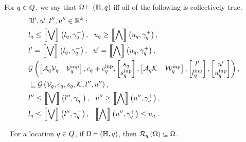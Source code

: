 \begin{definition}
  For $q\in Q$, we say that
  $\Omega\vdash\left(\mathbb{H},q\right)$ iff  all of the following is
  collectively true.
%
\begin{align}
& \exists l^\prime,u^\prime,l^{\prime\prime},u^{\prime\prime}\in\mathbb{R}^k:\nonumber\\
& l_q\leq\left\llbracket\bigvee\right\rrbracket\left(l_q,\gamma_q^-\right),~~u_q\geq\left\llbracket\bigwedge\right\rrbracket\left(u_q,\gamma_q^+\right),~\label{eqn:continv1}\\
& l^\prime= \left\llbracket\bigvee\right\rrbracket\left(l_q,\gamma_q^-\right),~~u^\prime= \left\llbracket\bigwedge\right\rrbracket\left(u_q,\gamma_q^+\right),~\label{eqn:continv2}\\
& \mathcal{G}\left(
\left[\begin{matrix}\mathcal{A}_q\mathcal{V}_q & \mathcal{V}^{\operatorname{inp}}_q\end{matrix}\right]
,
c_q+c^{\operatorname{inp}}_q
,
\left[\begin{matrix}s_q\\ s^{\operatorname{inp}}_q\end{matrix}\right]
,
\left[\begin{matrix}\mathcal{A}_q\mathcal{K} & \mathcal{W}^{\operatorname{inp}}_q\end{matrix}\right]
,
\left[\begin{matrix}l^\prime\\l^{\operatorname{inp}}_q\end{matrix}\right]
,
\left[\begin{matrix}u^\prime\\ u^{\operatorname{inp}}_q\end{matrix}\right]
\right),\nonumber\\
& \sqsubseteq 
\mathcal{G}\left(\mathcal{V}_q,c_q,s_q,\mathcal{K},l^{\prime\prime},u^{\prime\prime}\right),~\label{eqn:continv3}\\
&
l^{\prime\prime}\leq\left\llbracket\bigvee\right\rrbracket\left(l^{\prime\prime},\gamma_q^-\right),~~u^{\prime\prime}\geq\left\llbracket\bigwedge\right\rrbracket\left(u^{\prime\prime},\gamma_q^+\right),~\label{eqn:continv4}\\
& l_q\leq\left\llbracket\bigvee\right\rrbracket\left(l^{\prime\prime},\gamma_q^-\right),~~\left\llbracket\bigwedge\right\rrbracket\left(u^{\prime\prime},\gamma_q^+\right)\leq u_q~\label{eqn:continv5}.
\end{align}
%
\end{definition}
%
\begin{lemma}~\label{lem:pi-cont}
For a location $q\in Q$, if $\Omega\vdash\left(\mathbb{H},q\right)$, then
$\mathcal{R}_{q}\left(\Omega\right)\subseteq\Omega$.
\end{lemma}
%

